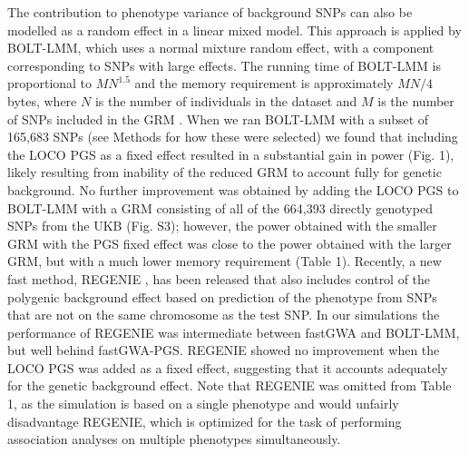 \documentclass[fleqn,10pt]{wlscirep}
\begin{document}
The contribution to phenotype variance of background SNPs can also be modelled as a random effect in a linear mixed model. This approach is applied by BOLT-LMM, which uses a normal mixture random effect, with a component corresponding to SNPs with large effects. The running time of BOLT-LMM is proportional to $MN^{1.5}$ and the memory requirement is approximately $MN/4$ bytes, where $N$ is the number of individuals in the dataset and $M$ is the number of SNPs included in the GRM \cite{BOLT}. When we ran BOLT-LMM with a subset of 165,683 SNPs (see Methods for how these were selected) we found that including the LOCO PGS as a fixed effect resulted in a substantial gain in power (Fig. 1), likely resulting from inability of the reduced GRM to account fully for genetic background. No further improvement was obtained by adding the LOCO PGS to BOLT-LMM with a GRM consisting of all of the 664,393 directly genotyped SNPs from the UKB (Fig. S3); however, the power obtained with the smaller GRM with the PGS fixed effect was close to the power obtained with the larger GRM, but with a much lower memory requirement (Table 1). Recently, a new fast method, REGENIE \cite{mbatchou2020computationally}, has been released that also includes control of the polygenic background effect based on prediction of the phenotype from SNPs that are not on the same chromosome as the test SNP. In our simulations the performance of REGENIE was intermediate between fastGWA and BOLT-LMM, but well behind fastGWA-PGS. REGENIE showed no improvement when the LOCO PGS was added as a fixed effect, suggesting that it accounts 
adequately for the genetic background effect. Note that REGENIE was omitted from Table 1, as the simulation is based on a single phenotype and would unfairly disadvantage REGENIE, which is optimized for the task of performing association analyses on multiple phenotypes simultaneously.  
\end{document}
